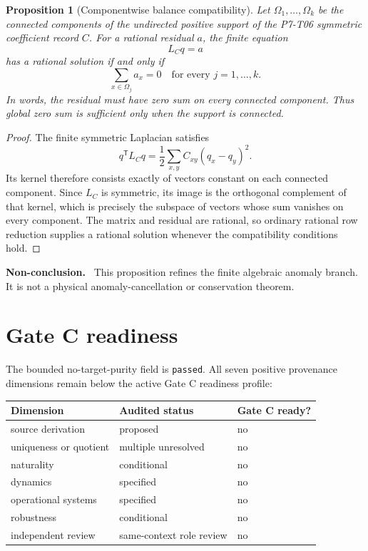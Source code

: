 \documentclass[11pt]{article}
\newtheorem{proposition}{Proposition}
\newenvironment{nonconclusion}{\par\smallskip\noindent\textbf{Non-conclusion.}\ }{\par\smallskip}
\begin{document}
\begin{proposition}[Componentwise balance compatibility]
\label{prop:component-balance}
Let \(\Omega_1,\ldots,\Omega_k\) be the connected components of the undirected
positive support of the P7-T06 symmetric coefficient record \(C\). For a
rational residual \(a\), the finite equation
\[
 L_Cq=a
\]
has a rational solution if and only if
\[
 \sum_{x\in\Omega_j}a_x=0
 \quad\text{for every }j=1,\ldots,k .
\]
In words, the residual must have zero sum on every connected component.
Thus global zero sum is sufficient only when the support is connected.
\end{proposition}

\begin{proof}
The finite symmetric Laplacian satisfies
\[
 q^{\mathsf T}L_Cq
 =\frac12\sum_{x,y}C_{xy}(q_x-q_y)^2 .
\]
Its kernel therefore consists exactly of vectors constant on each connected
component. Since \(L_C\) is symmetric, its image is the orthogonal complement
of that kernel, which is precisely the subspace of vectors whose sum vanishes
on every component. The matrix and residual are rational, so ordinary
rational row reduction supplies a rational solution whenever the
compatibility conditions hold.
\end{proof}

\begin{nonconclusion}
This proposition refines the finite algebraic anomaly branch. It is not a
physical anomaly-cancellation or conservation theorem.
\end{nonconclusion}

\section{Gate C readiness}

The bounded no-target-purity field is \texttt{passed}. All seven positive
provenance dimensions remain below the active Gate C readiness profile:
\begin{center}
\begin{tabular}{lll}
\toprule
Dimension & Audited status & Gate C ready?\\
\midrule
source derivation & proposed & no\\
uniqueness or quotient & multiple unresolved & no\\
naturality & conditional & no\\
dynamics & specified & no\\
operational systems & specified & no\\
robustness & conditional & no\\
independent review & same-context role review & no\\
\bottomrule
\end{tabular}
\end{center}
\end{document}
